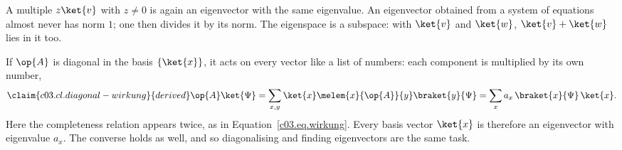 
A multiple $z\ket{v}$ with $z \neq 0$ is again an eigenvector with the same eigenvalue. An
eigenvector obtained from a system of equations almost never has norm $1$; one then divides it by
its norm. The eigenspace is a subspace: with $\ket{v}$ and $\ket{w}$, $\ket{v} + \ket{w}$ lies in it
too.


If $\op{A}$ is diagonal in the basis $\{\ket{x}\}$, it acts on every vector like a list of
numbers: each component is multiplied by its own number,
\begin{equation}\label{c03.eq.diagonal-wirkung}\claim{c03.cl.diagonal-wirkung}{derived}
  \op{A}\ket{\Psi}
  = \sum_{x,y} \ket{x}\melem{x}{\op{A}}{y}\braket{y}{\Psi}
  = \sum_{x} a_x\, \braket{x}{\Psi}\, \ket{x} .
\end{equation}
Here the completeness relation appears twice, as in Equation~\eqref{c03.eq.wirkung}. Every basis
vector $\ket{x}$ is therefore an eigenvector with eigenvalue $a_x$. The converse holds as well, and
so diagonalising and finding eigenvectors are the same task.

